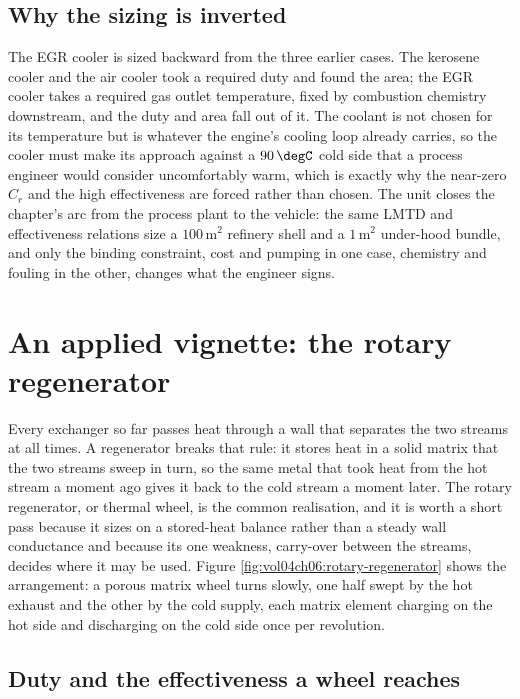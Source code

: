 \subsection{Why the sizing is inverted}

The EGR cooler is sized backward from the three earlier cases. The kerosene cooler
and the air cooler took a required duty and found the area; the EGR cooler takes a
required gas outlet temperature, fixed by combustion chemistry downstream, and the
duty and area fall out of it. The coolant is not chosen for its temperature but is
whatever the engine's cooling loop already carries, so the cooler must make its
approach against a $90\,\degC$ cold side that a process engineer would consider
uncomfortably warm, which is exactly why the near-zero $C_r$ and the high
effectiveness are forced rather than chosen. The unit closes the chapter's arc from
the process plant to the vehicle: the same LMTD and effectiveness relations size a
$100\,\text{m}^2$ refinery shell and a $1\,\text{m}^2$ under-hood bundle, and only
the binding constraint, cost and pumping in one case, chemistry and fouling in the
other, changes what the engineer signs.

\section{An applied vignette: the rotary regenerator}

Every exchanger so far passes heat through a wall that separates the two streams
at all times. A regenerator breaks that rule: it stores heat in a solid matrix
that the two streams sweep in turn, so the same metal that took heat from the hot
stream a moment ago gives it back to the cold stream a moment later. The rotary
regenerator, or thermal wheel, is the common realisation, and it is worth a short
pass because it sizes on a stored-heat balance rather than a steady wall
conductance and because its one weakness, carry-over between the streams, decides
where it may be used. Figure \ref{fig:vol04ch06:rotary-regenerator} shows the
arrangement: a porous matrix wheel turns slowly, one half swept by the hot exhaust
and the other by the cold supply, each matrix element charging on the hot side and
discharging on the cold side once per revolution.



\subsection{Duty and the effectiveness a wheel reaches}


